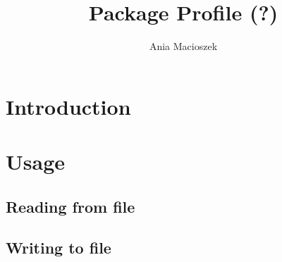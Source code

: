 \documentclass[a4paper,11pt,portrait]{article}
\title{Package Profile (?)}
\author{Ania Macioszek}
\date{}
\begin{document}
\maketitle

\section{Introduction}


\section{Usage}

\subsection{Reading from file}


\subsection{Writing to file}
\end{document}
